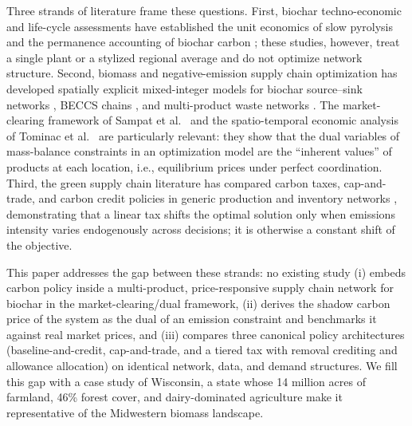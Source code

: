 Three strands of literature frame these questions. First, biochar techno-economic
and life-cycle assessments have established the unit economics of slow pyrolysis
and the permanence accounting of biochar carbon
\cite{roberts2010, woolf2010, nematian2021}; these studies, however, treat a
single plant or a stylized regional average and do not optimize network structure.
Second, biomass and negative-emission supply chain optimization has developed
spatially explicit mixed-integer models for biochar source--sink networks
\cite{tan2016biochar, belmonte2018}, BECCS chains \cite{negri2021}, and
multi-product waste networks \cite{sampat2019}. The market-clearing framework of
Sampat et al.~\cite{sampat2019} and the spatio-temporal economic analysis of
Tominac et al.~\cite{tominac2022} are particularly relevant: they show that the
dual variables of mass-balance constraints in an optimization model are the
``inherent values'' of products at each location, i.e., equilibrium prices
under perfect coordination. Third, the green supply chain literature has compared
carbon taxes, cap-and-trade, and carbon credit policies in generic production and
inventory networks \cite{benjaafar2013, zakeri2015, chaabane2012, elhedhli2012},
demonstrating that a linear tax shifts the optimal solution only when emissions
intensity varies endogenously across decisions; it is otherwise a constant
shift of the objective.

This paper addresses the gap between these strands: no existing
study (i) embeds carbon policy inside a multi-product, price-responsive
supply chain network for biochar in the market-clearing/dual framework, (ii)
derives the shadow carbon price of the system as the dual of an
emission constraint and benchmarks it against real market prices, and (iii)
compares three canonical policy architectures (baseline-and-credit,
cap-and-trade, and a tiered tax with removal crediting and allowance
allocation) on identical network, data, and demand structures. We fill this gap
with a case study of Wisconsin, a state whose 14 million acres of farmland, 46\%
forest cover, and dairy-dominated agriculture make it representative of the
Midwestern biomass landscape.

